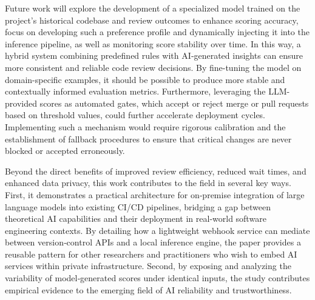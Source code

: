 \documentclass[12pt]{article}
\begin{document}
Future work will explore the development of a specialized model trained on the project's historical codebase and review outcomes to enhance scoring accuracy, focus on developing such a preference profile and dynamically injecting it into the inference pipeline, as well as monitoring score stability over time. In this way, a hybrid system combining predefined rules with AI‑generated insights can ensure more consistent and reliable code review decisions. By fine-tuning the model on domain-specific examples, it should be possible to produce more stable and contextually informed evaluation metrics. Furthermore, leveraging the LLM-provided scores as automated gates, which accept or reject merge or pull requests based on threshold values, could further accelerate deployment cycles. Implementing such a mechanism would require rigorous calibration and the establishment of fallback procedures to ensure that critical changes are never blocked or accepted erroneously.

Beyond the direct benefits of improved review efficiency, reduced wait times, and enhanced data privacy, this work contributes to the field in several key ways. First, it demonstrates a practical architecture for on‑premise integration of large language models into existing CI/CD pipelines, bridging a gap between theoretical AI capabilities and their deployment in real‑world software engineering contexts. By detailing how a lightweight webhook service can mediate between version‑control APIs and a local inference engine, the paper provides a reusable pattern for other researchers and practitioners who wish to embed AI services within private infrastructure. Second, by exposing and analyzing the variability of model‑generated scores under identical inputs, the study contributes empirical evidence to the emerging field of AI reliability and trustworthiness.



\end{document}
